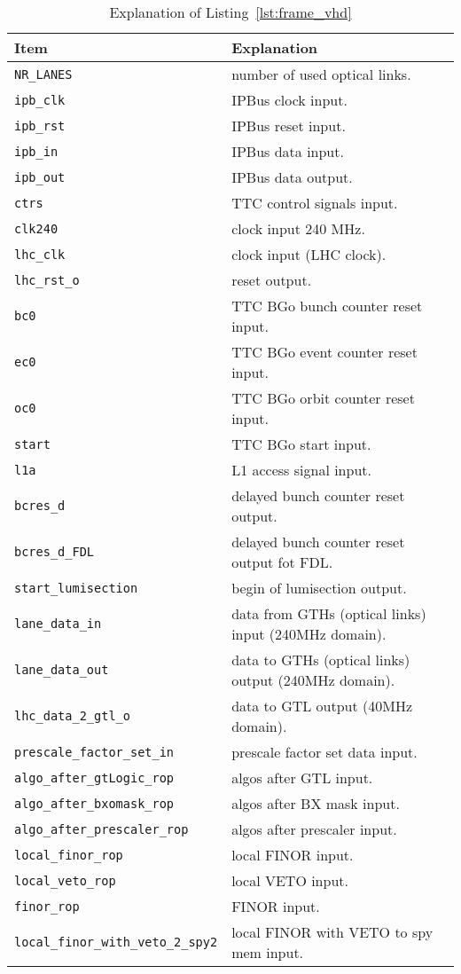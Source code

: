 \medskip
\begin{table}
\footnotesize
\caption{Explanation of Listing~\ref{lst:frame_vhd}}
\vspace{5mm}
\centering
\begin{tabular}{l p{}}
\toprule
{Item} & {Explanation}\\
\midrule
\verb|NR_LANES| & number of used optical links.\\
\verb|ipb_clk| & IPBus clock input.\\
\verb|ipb_rst| & IPBus reset input.\\
\verb|ipb_in| & IPBus data input.\\
\verb|ipb_out| & IPBus data output.\\
\verb|ctrs| & TTC control signals input.\\
\verb|clk240| & clock input 240 MHz.\\
\verb|lhc_clk| & clock input (LHC clock).\\
\verb|lhc_rst_o| & reset output.\\
\verb|bc0| & TTC BGo bunch counter reset input.\\
\verb|ec0| & TTC BGo event counter reset input.\\
\verb|oc0| & TTC BGo orbit counter reset input.\\
\verb|start| & TTC BGo start input.\\
\verb|l1a| & L1 access signal input.\\
\verb|bcres_d| & delayed bunch counter reset output.\\
\verb|bcres_d_FDL| & delayed bunch counter reset output fot FDL.\\
\verb|start_lumisection| & begin of lumisection output.\\
\verb|lane_data_in| & data from GTHs (optical links) input (240MHz domain).\\
\verb|lane_data_out| & data to GTHs (optical links) output (240MHz domain).\\
\verb|lhc_data_2_gtl_o| & data to GTL output (40MHz domain).\\
\verb|prescale_factor_set_in| & prescale factor set data input.\\
\verb|algo_after_gtLogic_rop| & algos after GTL input.\\
\verb|algo_after_bxomask_rop| & algos after BX mask input.\\
\verb|algo_after_prescaler_rop| & algos after prescaler input.\\
\verb|local_finor_rop| & local FINOR input.\\
\verb|local_veto_rop| & local VETO input.\\
\verb|finor_rop| & FINOR input.\\
\verb|local_finor_with_veto_2_spy2| & local FINOR with VETO to spy mem input.\\
\bottomrule
\end{tabular}
\label{tab:gtl:explanation_frame_vhd}
\end{table}

